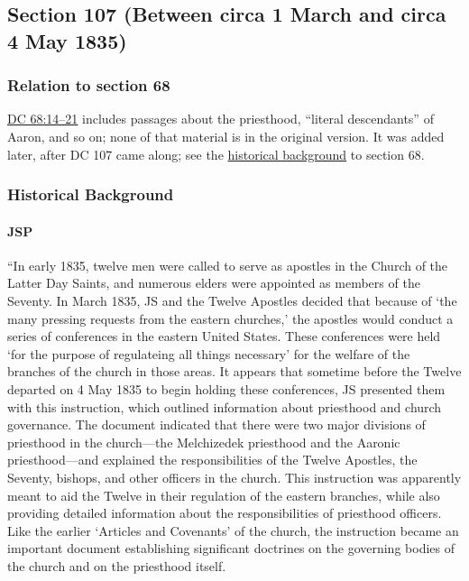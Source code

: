 \subsection{Section 107 (Between circa 1 March and circa 4 May 1835)}
	\label{DC107}
	
	\subsubsection{Relation to section 68}
	
		\hyperref[DC68-14]{DC 68:14--21} includes passages about the priesthood, ``literal descendants'' of Aaron, and so on; none of that material is in the original version. It was added later, after DC 107 came along; see the \hyperref[DC68-HB]{historical background} to section 68.
	
	\subsubsection{Historical Background}
		\label{DC107-HB}
		
		\paragraph{JSP}
		
			``In early 1835, twelve men were called to serve as apostles in the Church of the Latter Day Saints, and numerous elders were appointed as members of the Seventy. In March 1835, JS and the Twelve Apostles decided that because of `the many pressing requests from the eastern churches,' the apostles would conduct a series of conferences in the eastern United States. These conferences were held `for the purpose of regulateing all things necessary' for the welfare of the branches of the church in those areas. It appears that sometime before the Twelve departed on 4 May 1835 to begin holding these conferences, JS presented them with this instruction, which outlined information about priesthood and church governance. The document indicated that there were two major divisions of priesthood in the church---the Melchizedek priesthood and the Aaronic priesthood---and explained the responsibilities of the Twelve Apostles, the Seventy, bishops, and other officers in the church. This instruction was apparently meant to aid the Twelve in their regulation of the eastern branches, while also providing detailed information about the responsibilities of priesthood officers. Like the earlier `Articles and Covenants' of the church, the instruction became an important document establishing significant doctrines on the governing bodies of the church and on the priesthood itself.
			
